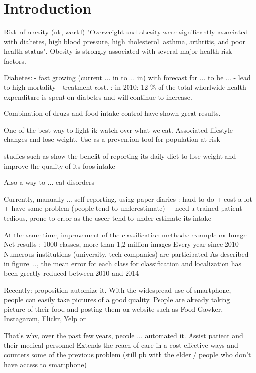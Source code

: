 \chapter{Introduction}

Risk of obesity \cite{Mokdad2003} (uk, world) "Overweight and obesity were significantly associated with diabetes, high blood pressure, high cholesterol, asthma, arthritis, and poor health status". Obesity is strongly associated with several major health risk factors.

Diabetes:
- fast growing (current ... in to ... in) with forecast for ... to be ...
- lead to high mortality
- treatment cost. \cite{Zhang2010}: in 2010: 12 \% of the total whorlwide health expenditure is spent on diabetes and will continue to increase.

Combination of drugs and food intake control have shown great results.

One of the best way to fight it: watch over what we eat. Associated lifestyle changes and lose weight. Use as a prevention tool for population at risk

studies such as \cite{Burke2011a} show the benefit of reporting its daily diet to lose weight and improve the quality of its foos intake

Also a way to ... eat disorders

Currently, manually ... self reporting, using paper diaries : hard to do + cost a lot + have some problem (people tend to underestimate) + need a trained patient
tedious, prone to error as the useer tend to under-estimate its intake

At the same time, improvement of the classification methods: example on Image Net results \cite{Russakovsky2015}:
1000 classes, more than 1,2 million images
Every year since 2010
Numerous institutions (university, tech companies) are participated
As described in figure ..., the mean error for each class for classification and localization has been greatly reduced between 2010 and 2014

Recently: proposition automize it. With the widespread use of smartphone, people can easily take pictures of a good quality. People are already taking picture of their food and posting them on website such as Food Gawker, Instagaram, Flickr, Yelp or 

That's why, over the past few years, people ... automated it. Assist patient and their medical personnel
Extends the reach of care in a cost effective ways and counters some of the previous problem (still pb with the elder / people who don't have access to smartphone)

